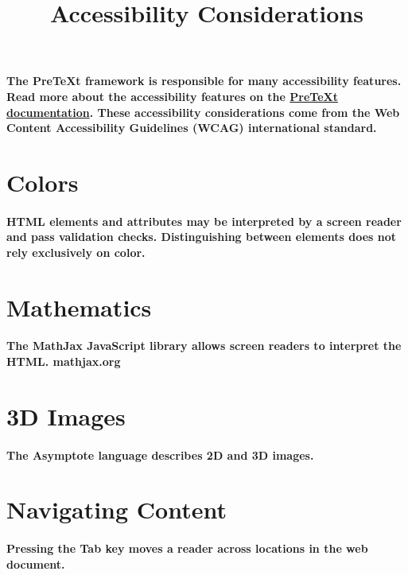 \documentclass{article}
\title{Accessibility Considerations}
\begin{document}
\maketitle
\paragraph{
The PreTeXt framework is responsible for many accessibility features. Read more about the accessibility features on the \href{https://pretextbook.org/doc/guide/html/topic-accessibility.html}{PreTeXt documentation}. These accessibility considerations come from the Web Content Accessibility Guidelines (WCAG) international standard.
}

\section{Colors}
\paragraph{
HTML elements and attributes may be interpreted by a screen reader and pass validation checks. Distinguishing between elements does not rely exclusively on color.
}

\section{Mathematics}
\paragraph{
The MathJax JavaScript library allows screen readers to interpret the HTML.
mathjax.org
}

\section{3D Images}
\paragraph{
The Asymptote language describes 2D and 3D images.
}

\section{Navigating Content}
\paragraph{
Pressing the Tab key moves a reader across locations in the web document.
}
\end{document}
